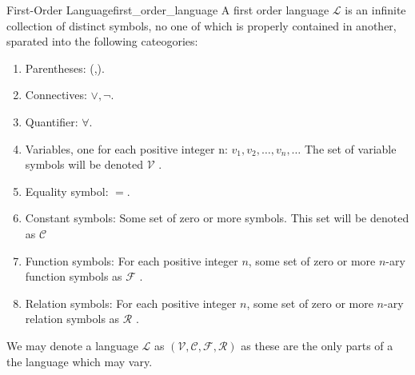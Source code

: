 \begin{definition}{First-Order Language}{first_order_language}
	A first order language $\mathcal{L}$ is an infinite collection of distinct symbols, no one of which is properly contained in another, sparated into the following cateogories:
	\begin{enumerate}
		\item Parentheses: (,).
		\item Connectives: $\lor, \neg$.
		\item Quantifier: $\forall$.
		\item Variables, one for each positive integer n: $v_{1}, v_{2}, \ldots, v_{n}, \ldots$ The set of variable symbols will be denoted $ \mathcal{ V }   $ .
		\item Equality symbol: $=$.
		\item Constant symbols: Some set of zero or more symbols. This set will be denoted as $ \mathcal{ C }   $ 
		\item Function symbols: For each positive integer $n$, some set of zero or more $n$-ary function symbols as $ \mathcal{ F }  $ .
		\item Relation symbols: For each positive integer $n$, some set of zero or more $n$-ary relation symbols as $ \mathcal{ R }  $ .
	\end{enumerate}
	We may denote a language $ \mathcal{ L }   $ as $ \left( \mathcal{ V } ,\mathcal{ C } , \mathcal{ F } , \mathcal{ R }      \right)  $ as these are the only parts of a the language which may vary.
\end{definition}
